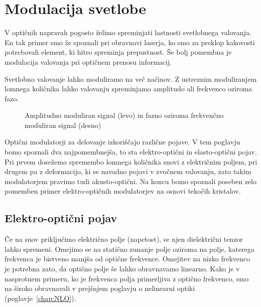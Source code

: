 
\chapter{Modulacija svetlobe}

V optičnih napravah pogosto želimo spreminjati lastnosti svetlobnega
valovanja. En tak primer smo že spoznali pri obravnavi laserja,
ko smo za preklop kakovosti potrebovali element, ki hitro spreminja prepustnost. 
Še bolj pomembna je modulacija valovanja pri optičnem prenosu informacij.

Svetlobno valovanje lahko moduliramo na več načinov. Z ustreznim moduliranjem
lomnega količnika lahko valovanju spreminjamo amplitudo ali frekvenco oziroma fazo. 
\begin{figure}[h]
\centering
\def\svgwidth{140truemm} 

\caption{Amplitudno moduliran signal (levo) in fazno oziroma frekvenčno moduliran signal (desno)
}
\label{fig:amfm}
\end{figure}

Optični modulatorji za delovanje izkoriščajo različne pojave. V tem poglavju bomo spoznali dva
najpomembnejša, to sta elektro-optični in elasto-optični pojav. Pri prvem 
dosežemo spremembo lomnega količnika snovi z električnim poljem, pri drugem pa z 
deformacijo, ki se navadno pojavi v zvočnem valovanju, zato takim modulatorjem pravimo tudi
akusto-optični. Na koncu bomo spoznali poseben zelo pomemben primer elektro-optičnih modulatorjev
na osnovi tekočih kristalov.

\section{Elektro-optični pojav}
Če na snov priključimo električno polje (napetost), se njen dielektrični tenzor lahko spremeni.
Omejimo se na statično zunanje polje oziroma na polje, katerega frekvenca 
je bistveno manjša od optične frekvence. Omejitev na nizko frekvenco je potrebna zato, 
da optično polje še lahko obravnavamo linearno. Kako je v nasprotnem primeru, ko je frekvenca
polja primerljiva z optično frekvenco, smo na široko obravnavali v prejšnjem poglavju o
nelinearni optiki (poglavje~\ref{chap:NLO}).

